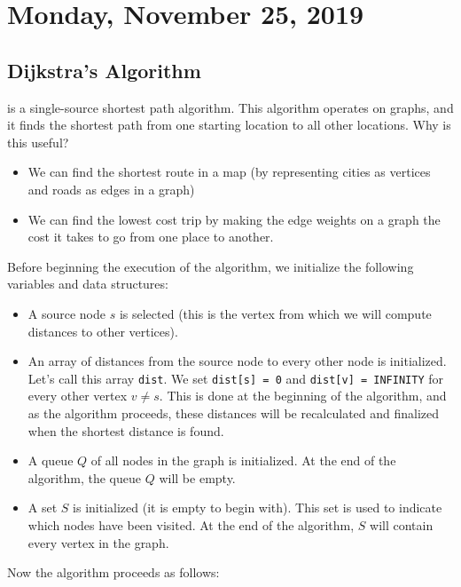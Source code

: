 \section{Monday, November 25, 2019}

\subsection{Dijkstra's Algorithm}

 is a single-source shortest path algorithm. This algorithm operates on graphs, and it finds the shortest path from one starting location to all other locations. Why is this useful? 
\begin{itemize}
    \item We can find the shortest route in a map (by representing cities as vertices and roads as edges in a graph)
    \item We can find the lowest cost trip by making the edge weights on a graph the cost it takes to go from one place to another.
\end{itemize}

Before beginning the execution of the algorithm, we initialize the following variables and data structures:

\begin{itemize}
    \item A source node $s$ is selected (this is the vertex from which we will compute distances to other vertices). 
    \item An array of distances from the source node to every other node is initialized. Let's call this array \verb!dist!. We set \verb!dist[s] = 0! and \verb!dist[v] = INFINITY! for every other vertex $v \neq s$. This is done at the beginning of the algorithm, and as the algorithm proceeds, these distances will be recalculated and finalized when the shortest distance is found.
    \item A queue $Q$ of all nodes in the graph is initialized. At the end of the algorithm, the queue $Q$ will be empty.
    \item A set $S$ is initialized (it is empty to begin with). This set is used to indicate which nodes have been visited. At the end of the algorithm, $S$ will contain every vertex in the graph.
\end{itemize}

Now the algorithm proceeds as follows:


